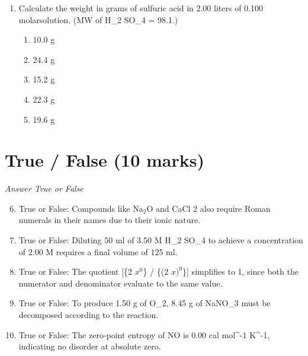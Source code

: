 \documentclass[12pt]{article}
\begin{document}
\begin{enumerate}[label=\arabic*.]
\begin{enumerate}[label=(\alph*)]
    \item Boiling point is 101.00^\ensuremath{\circC}, Freezing point is -2.00^\ensuremath{\circC}
    \item Boiling point is 99.57^\ensuremath{\circC}, Freezing point is 1.55^\ensuremath{\circC}
    \item Boiling point is 100.0^\ensuremath{\circC}, Freezing point is 0.0^\ensuremath{\circC}
    \item Boiling point is 100.43^\ensuremath{\circC}, Freezing point is 1.55^\ensuremath{\circC}
\end{enumerate}
\item Calculate the weight in grams of sulfuric acid in 2.00 liters of 0.100 molarsolution. (MW of H\_2 SO\_4 = 98.1.)
\begin{enumerate}[label=(\alph*)]
    \item 10.0 g
    \item 24.4 g
    \item 15.2 g
    \item 22.3 g
    \item 19.6 g
\end{enumerate}
\end{enumerate}

\section*{True / False (10 marks)}
\textit{Answer True or False}
\begin{enumerate}[label=\arabic*.]
\setcounter{enumi}{5}
\item True or False: Compounds like Na$_{2}$O and CaCl 2 also require Roman numerals in their names due to their ionic nature.
\item True or False: Diluting 50 ml of 3.50 M H\_2 SO\_4 to achieve a concentration of 2.00 M requires a final volume of 125 ml.
\item True or False: The quotient [\{2 $x^0$\} / \{(2 $x)^0$\}] simplifies to 1, since both the numerator and denominator evaluate to the same value.
\item True or False: To produce 1.50 g of O\_2, 8.45 g of NaNO\_3 must be decomposed according to the reaction.
\item True or False: The zero-point entropy of NO is 0.00 cal mol^-1 K^-1, indicating no disorder at absolute zero.
\end{enumerate}
\end{document}
